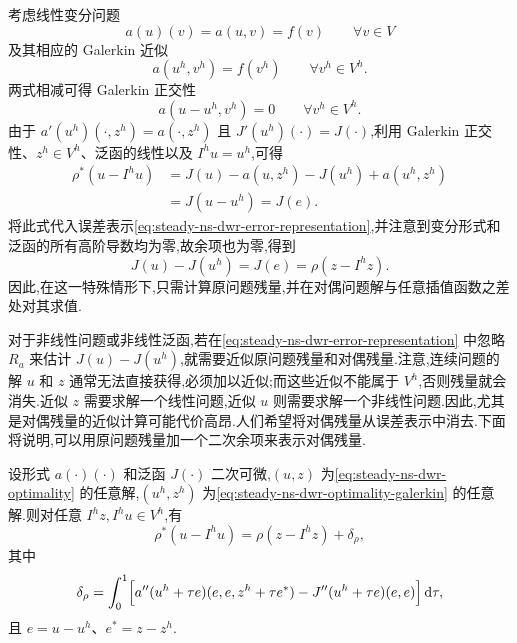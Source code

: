 \begin{note}[线性变分问题和线性泛函]\label{note:steady-ns-dwr-linear}
考虑线性变分问题
\[
  a(u)(v)=a(u,v)=f(v)\qquad \forall v\in V
\]
及其相应的 Galerkin 近似
\[
  a(u^h,v^h)=f(v^h)\qquad \forall v^h\in V^h.
\]
两式相减可得 Galerkin 正交性
\[
  a(u-u^h,v^h)=0\qquad \forall v^h\in V^h.
\]
由于 $a'(u^h)(\cdot,z^h)=a(\cdot,z^h)$ 且 $J'(u^h)(\cdot)=J(\cdot)$,利用 Galerkin 正交性、$z^h\in V^h$、泛函的线性以及 $I^h u=u^h$,可得
\[
\begin{aligned}
  \rho^*(u-I^h u)
   &=J(u)-a(u,z^h)-J(u^h)+a(u^h,z^h)\\
   &=J(u-u^h)=J(e).
\end{aligned}
\]
将此式代入误差表示\cref{eq:steady-ns-dwr-error-representation},并注意到变分形式和泛函的所有高阶导数均为零,故余项也为零,得到
\[
  J(u)-J(u^h)=J(e)=\rho(z-I^h z).
\]
因此,在这一特殊情形下,只需计算原问题残量,并在对偶问题解与任意插值函数之差处对其求值.
\end{note}

\begin{note}[从误差表示中消去对偶残量的动机]\label{note:steady-ns-dwr-remove-dual-motivation}
对于非线性问题或非线性泛函,若在\cref{eq:steady-ns-dwr-error-representation} 中忽略 $R_a$ 来估计 $J(u)-J(u^h)$,就需要近似原问题残量和对偶残量.注意,连续问题的解 $u$ 和 $z$ 通常无法直接获得,必须加以近似;而这些近似不能属于 $V^h$,否则残量就会消失.近似 $z$ 需要求解一个线性问题,近似 $u$ 则需要求解一个非线性问题.因此,尤其是对偶残量的近似计算可能代价高昂.人们希望将对偶残量从误差表示中消去.下面将说明,可以用原问题残量加一个二次余项来表示对偶残量.
\end{note}

\begin{lemma}[用原问题残量和二次余项表示对偶残量]\label{lem:steady-ns-dwr-dual-residual}
设形式 $a(\cdot)(\cdot)$ 和泛函 $J(\cdot)$ 二次可微,$(u,z)$ 为\cref{eq:steady-ns-dwr-optimality} 的任意解,$(u^h,z^h)$ 为\cref{eq:steady-ns-dwr-optimality-galerkin} 的任意解.则对任意 $I^h z,I^h u\in V^h$,有
\begin{equation}\label{eq:steady-ns-dwr-residual-identity}
  \rho^*(u-I^h u)=\rho(z-I^h z)+\delta_\rho,
\end{equation}
其中
\[
  \delta_\rho=\int_0^1\Bigl[
    a''(u^h+\tau e)(e,e,z^h+\tau e^*)
    -J''(u^h+\tau e)(e,e)\Bigr]\,\mathrm{d}\tau,
\]
且 $e=u-u^h$、$e^*=z-z^h$.
\end{lemma}

